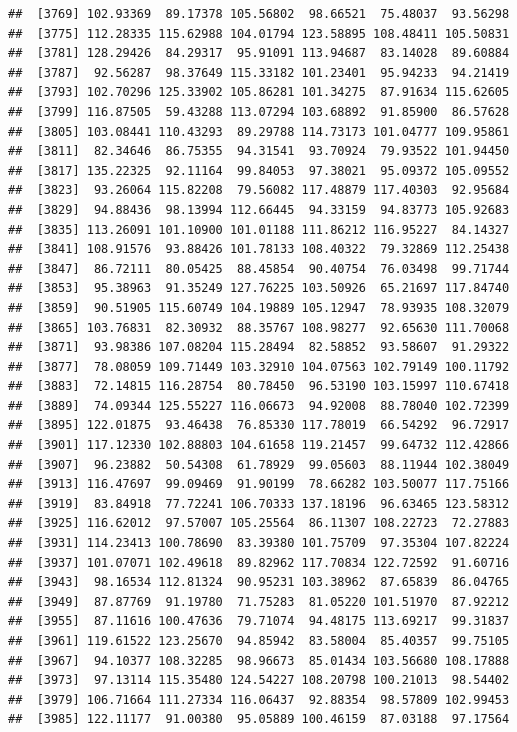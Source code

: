 \documentclass[
]{article}
\begin{document}
\begin{verbatim}
##  [3769] 102.93369  89.17378 105.56802  98.66521  75.48037  93.56298
##  [3775] 112.28335 115.62988 104.01794 123.58895 108.48411 105.50831
##  [3781] 128.29426  84.29317  95.91091 113.94687  83.14028  89.60884
##  [3787]  92.56287  98.37649 115.33182 101.23401  95.94233  94.21419
##  [3793] 102.70296 125.33902 105.86281 101.34275  87.91634 115.62605
##  [3799] 116.87505  59.43288 113.07294 103.68892  91.85900  86.57628
##  [3805] 103.08441 110.43293  89.29788 114.73173 101.04777 109.95861
##  [3811]  82.34646  86.75355  94.31541  93.70924  79.93522 101.94450
##  [3817] 135.22325  92.11164  99.84053  97.38021  95.09372 105.09552
##  [3823]  93.26064 115.82208  79.56082 117.48879 117.40303  92.95684
##  [3829]  94.88436  98.13994 112.66445  94.33159  94.83773 105.92683
##  [3835] 113.26091 101.10900 101.01188 111.86212 116.95227  84.14327
##  [3841] 108.91576  93.88426 101.78133 108.40322  79.32869 112.25438
##  [3847]  86.72111  80.05425  88.45854  90.40754  76.03498  99.71744
##  [3853]  95.38963  91.35249 127.76225 103.50926  65.21697 117.84740
##  [3859]  90.51905 115.60749 104.19889 105.12947  78.93935 108.32079
##  [3865] 103.76831  82.30932  88.35767 108.98277  92.65630 111.70068
##  [3871]  93.98386 107.08204 115.28494  82.58852  93.58607  91.29322
##  [3877]  78.08059 109.71449 103.32910 104.07563 102.79149 100.11792
##  [3883]  72.14815 116.28754  80.78450  96.53190 103.15997 110.67418
##  [3889]  74.09344 125.55227 116.06673  94.92008  88.78040 102.72399
##  [3895] 122.01875  93.46438  76.85330 117.78019  66.54292  96.72917
##  [3901] 117.12330 102.88803 104.61658 119.21457  99.64732 112.42866
##  [3907]  96.23882  50.54308  61.78929  99.05603  88.11944 102.38049
##  [3913] 116.47697  99.09469  91.90199  78.66282 103.50077 117.75166
##  [3919]  83.84918  77.72241 106.70333 137.18196  96.63465 123.58312
##  [3925] 116.62012  97.57007 105.25564  86.11307 108.22723  72.27883
##  [3931] 114.23413 100.78690  83.39380 101.75709  97.35304 107.82224
##  [3937] 101.07071 102.49618  89.82962 117.70834 122.72592  91.60716
##  [3943]  98.16534 112.81324  90.95231 103.38962  87.65839  86.04765
##  [3949]  87.87769  91.19780  71.75283  81.05220 101.51970  87.92212
##  [3955]  87.11616 100.47636  79.71074  94.48175 113.69217  99.31837
##  [3961] 119.61522 123.25670  94.85942  83.58004  85.40357  99.75105
##  [3967]  94.10377 108.32285  98.96673  85.01434 103.56680 108.17888
##  [3973]  97.13114 115.35480 124.54227 108.20798 100.21013  98.54402
##  [3979] 106.71664 111.27334 116.06437  92.88354  98.57809 102.99453
##  [3985] 122.11177  91.00380  95.05889 100.46159  87.03188  97.17564

\end{verbatim}
\end{document}
